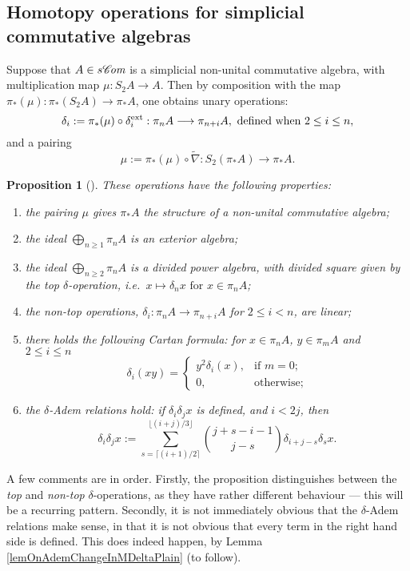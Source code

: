 \documentclass[11pt]{amsart} \renewcommand{\baselinestretch}{1.2}
\theoremstyle{plain}
\newtheorem{prop}[thm]{Proposition}
\numberwithin{equation}{section} %
\theoremstyle{plain}
\newtheorem{prop}[thm]{Proposition}
\numberwithin{equation}{chapter} %
\renewcommand{\to}{\longrightarrow}
\newcommand{\scrC}{\mathscr{C}}
\newcommand{\algs}{{\scrC\!\textit{\normalfont\textit{om}}}}
\renewcommand{\mapsto}{\longmapsto}
\newcommand{\SubsectionOrSection}[1]{\subsection{#1}}
\begin{document}
\begin{Constructing homotopy operations}
\SubsectionOrSection{Homotopy operations for simplicial commutative algebras}\label{Homotopy operations for simplicial commutative algebras}
Suppose that $A\in s \algs$ is a simplicial non-unital commutative algebra, with multiplication map $\mu:S_2A\to A$. Then by composition with the map $\pi_*(\mu):\pi_*(S_2A)\to \pi_*A$, one obtains unary operations:
\[\delta_i:=\pi_*(\mu)\circ\delta_i^\textup{ext}:\pi_nA\to \pi_{n+i}A,\textup{ defined when }2\leq i\leq n,\]
and a pairing\[\mu:=\pi_*(\mu)\circ\widetilde{\nabla}:S_2(\pi_*A)\to \pi_{*}A.\]
\begin{prop}[{\cite{DwyerHtpyOpsSimpComAlg.pdf}}]
\label{omnibus on htpy of simp algs}
These operations have the following properties:
\begin{enumerate}
\item the pairing $\mu$ gives $\pi_*A$ the structure of a non-unital commutative algebra;
\item the ideal $\bigoplus_{n\geq1}\pi_nA$ is an exterior algebra;
\item the ideal $\bigoplus_{n\geq2}\pi_nA$ is a divided power algebra, with divided square given by the \emph{top $\delta$-operation}, i.e.\ $x\mapsto \delta_nx\text{ for }x\in\pi_nA$;
\item the \emph{non-top operations}, $\delta_i:\pi_nA\to \pi_{n+i}A$ for $2\leq i<n$, are linear;
\item there holds the following \emph{Cartan formula}: for $x\in\pi_nA$, $y\in \pi_mA$ and $2\leq i\leq n$
\[\delta_i(xy)=\begin{cases}
y^2\delta_i(x),&\text{if }m=0;\\
0,&\text{otherwise};
\end{cases}
\]
\item \label{deltaademsunstable} the \emph{$\delta$-Adem relations} hold: if $\delta_i\delta_jx$ is defined, and $i<2j$, then
\[\delta_i\delta_jx:=\sum_{s=\lceil(i+1)/2\rceil}^{\lfloor(i+j)/3\rfloor}\binom{j+s-i-1}{ j-s}\delta_{i+j-s}\delta_sx.\]
\end{enumerate}
\end{prop}
A few comments are in order. Firstly, the proposition distinguishes between the \emph{top} and \emph{non-top} $\delta$-operations, as they have rather different behaviour --- this will be a recurring pattern. Secondly, it is not immediately obvious that the $\delta$-Adem relations make sense, in that it is not obvious that every term in the right hand side is defined. This does indeed happen, by Lemma \ref{lemOnAdemChangeInMDeltaPlain} (to follow). 


\end{Constructing homotopy operations}
\end{document}
